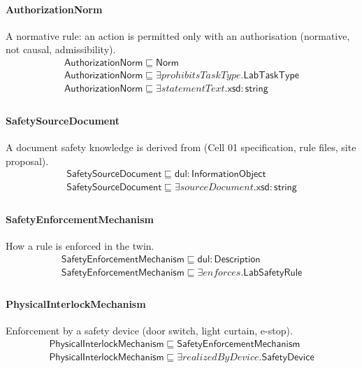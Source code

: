 \documentclass[10pt]{article}
\begin{document}
\paragraph{AuthorizationNorm} A normative rule: an action is permitted only with an authorisation (normative, not causal, admissibility).
\[\begin{array}{l}
\mathsf{AuthorizationNorm} \sqsubseteq  \mathsf{Norm} \\
\mathsf{AuthorizationNorm} \sqsubseteq  \exists \mathit{prohibitsTaskType}.\mathsf{LabTaskType} \\
\mathsf{AuthorizationNorm} \sqsubseteq  \exists \mathit{statementText}.\mathsf{xsd{:}string} \\
\end{array}\]
\paragraph{SafetySourceDocument} A document safety knowledge is derived from (Cell 01 specification, rule files, site proposal).
\[\begin{array}{l}
\mathsf{SafetySourceDocument} \sqsubseteq  \mathsf{dul{:}InformationObject} \\
\mathsf{SafetySourceDocument} \sqsubseteq  \exists \mathit{sourceDocument}.\mathsf{xsd{:}string} \\
\end{array}\]
\paragraph{SafetyEnforcementMechanism} How a rule is enforced in the twin.
\[\begin{array}{l}
\mathsf{SafetyEnforcementMechanism} \sqsubseteq  \mathsf{dul{:}Description} \\
\mathsf{SafetyEnforcementMechanism} \sqsubseteq  \exists \mathit{enforces}.\mathsf{LabSafetyRule} \\
\end{array}\]
\paragraph{PhysicalInterlockMechanism} Enforcement by a safety device (door switch, light curtain, e-stop).
\[\begin{array}{l}
\mathsf{PhysicalInterlockMechanism} \sqsubseteq  \mathsf{SafetyEnforcementMechanism} \\
\mathsf{PhysicalInterlockMechanism} \sqsubseteq  \exists \mathit{realizedByDevice}.\mathsf{SafetyDevice} \\
\end{array}\]
\end{document}
